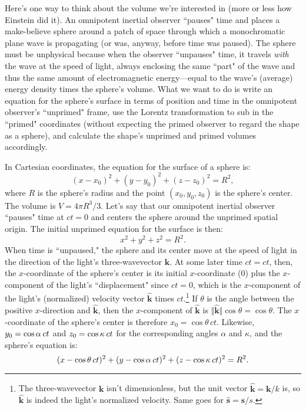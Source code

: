 \documentclass[12pt]{article}
\renewcommand{\vv}[1]{\mathbf{#1}}
\begin{document}
Here's one way to think about the volume we're interested in (more or less how Einstein did it). An omnipotent inertial observer ``pauses" time and places a make-believe sphere around a patch of space through which a monochromatic plane wave is propagating (or was, anyway, before time was paused). The sphere must be unphysical because when the observer ``unpauses" time, it travels \emph{with} the wave at the speed of light, always enclosing the same ``part" of the wave and thus the same amount of electromagnetic energy---equal to the wave's (average) energy density times the sphere's volume. What we want to do is write an equation for the sphere's surface in terms of position and time in the omnipotent observer's ``unprimed" frame, use the Lorentz transformation to sub in the ``primed" coordinates (without expecting the primed observer to regard the shape as a sphere), and calculate the shape's unprimed and primed volumes accordingly.

In Cartesian coordinates, the equation for the surface of a sphere is:
\begin{equation*}
(x - x_0)^2 + (y - y_0)^2 + (z - z_0)^2 = R^2,
\end{equation*}
where $R$ is the sphere's radius and the point $(x_0, y_0, z_0)$ is the sphere's center. The volume is $V = 4 \pi R^3 / 3$. Let's say that our omnipotent inertial observer ``pauses" time at ${ct = 0}$ and centers the sphere around the unprimed spatial origin. The initial unprimed equation for the surface is then:
\begin{equation*}
x^2 + y^2 + z^2 = R^2.
\end{equation*}
When time is ``unpaused," the sphere and its center move at the speed of light in the direction of the light's three-wavevector $\vv k$. At some later time $ct = ct$, then, the $x$-coordinate of the sphere's center is its initial $x$-coordinate ($0$) plus the $x$-component of the light's ``displacement" since $ct = 0$, which is the $x$-component of the light's (normalized) velocity vector $\vv{\hat{k}}$ times $ct$.\footnote{The three-wavevector $\vv k$ isn't dimensionless, but the unit vector $\vv{\hat{k}} = \vv k / k$ is, so $\vv{\hat{k}}$ is indeed the light's normalized velocity. Same goes for $\vv{\hat s} = \vv s / s$.} If $\theta$ is the angle between the positive $x$-direction and $\vv{\hat{k}}$, then the $x$-component of $\vv{\hat{k}}$ is $\Vert \vv{\hat{k}} \Vert \cos{\theta} = \cos{\theta}$. The $x$-coordinate of the sphere's center is therefore $x_0 = \cos{\theta} \, ct$. Likewise, $y_0 = \cos{\alpha} \, \mkern.5mu ct$ and $z_0 = \cos{\kappa} \, \mkern.5mu ct$ for the corresponding angles $\alpha$ and $\kappa$, and the sphere's equation is:
\begin{equation*}
(x - \cos{\theta} \, ct)^2 + (y - \cos{\alpha} \, \mkern.5mu ct)^2 + (z - \cos{\kappa} \, \mkern.5mu ct)^2 = R^2 .
\end{equation*}
\end{document}
